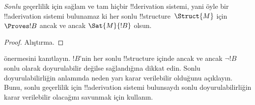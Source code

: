 \begin{cor}%
  \emph{Sonlu} geçerlilik için sağlam ve tam hiçbir !!{derivation} sistemi,
  yani öyle bir !!a{derivation} sistemi bulunamaz ki her sonlu
  !!{structure}~$\Struct{M}$ için $\Proves !B$ ancak ve ancak
  $\Sat{M}{!B}$ olsun.
\end{cor}

\begin{proof}
  Alıştırma.
\end{proof}

\begin{prob}
   önermesini kanıtlayın. $!B$'nin
  her sonlu !!{structure} içinde ancak ve ancak $\lnot !B$ sonlu olarak
  doyurulabilir değilse sağlandığına dikkat edin. Sonlu doyurulabilirliğin
   anlamında neden yarı karar verilebilir
  olduğunu açıklayın. Bunu, sonlu geçerlilik için !!a{derivation} sistemi
  bulunsaydı sonlu doyurulabilirliğin karar verilebilir olacağını savunmak
  için kullanın.
\end{prob}


